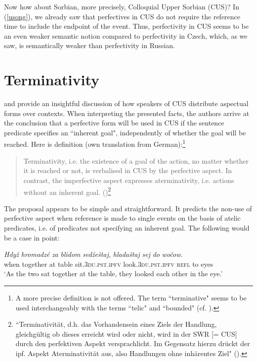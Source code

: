 \documentclass[output=paper,colorlinks,citecolor=brown]{langscibook}
\begin{document}
Now how about Sorbian, more precisely, Colloquial Upper Sorbian (CUS)? In (\ref{usong}), we already saw that perfectives in CUS do not require the reference time to include the endpoint of the event. Thus, perfectivity in CUS seems to be an even weaker semantic notion compared to perfectivity in Czech, which, as we saw, is semantically weaker than perfectivity in Russian. 

\section{Terminativity}\label{mueller:sec:term}
\citet{Breu2000, Breu2012} and \citet{Scholze2008} provide an insightful discussion of how speakers of CUS distribute aspectual forms over contexts. When interpreting the presented facts, the authors arrive at the conclusion that a perfective form will be used in CUS if the sentence predicate specifies an ``inherent goal", independently of whether the goal will be reached. 
Here is  definition (own translation from German):\footnote{A more precise definition is not offered. The term ``terminative" seems to be used interchangeably with the terms ``telic" and ``bounded" (cf. \citealt[264]{Breu2012}).} 

\begin{quote}
Terminativity, i.e. the existence of a goal of the action, no matter
whether it is reached or not, is verbalised in CUS by the perfective aspect.
In contrast, the imperfective aspect expresses aterminativity,
i.e. actions without an 
inherent goal. 
(\citealt[232-233]{Scholze2008})\footnote{``Terminativit\"at, d.h. das Vorhandensein eines Ziels der Handlung, 
gleichg\"ultig ob dieses er\-reicht wird oder nicht, wird in der SWR [= CUS]
durch den perfektiven Aspekt versprachlicht. Im Gegensatz hierzu dr\"uckt 
der ipf. Aspekt Aterminativit\"at aus, 
also Handlungen ohne inh\"arentes Ziel" 
(\citealt[232-233]{Scholze2008}).} 
\end{quote}

The proposal appears to be simple and straightforward.
It predicts the non-use of perfective aspect when reference is made to single events on the basis of atelic predicates, i.e. of predicates not specifying an inherent goal. The following would be a case in point: 

 \ea\label{blid}
\gll \textit{Hdyž} \textit{hromadz\'e} \textit{za} \textit{blidom} \textit{sed\'zeštaj,}
\textit{hladaštaj} \textit{sej} \textit{do} \textit{wo\v{c}ow.}\\
when together at table sit.\textsc{3du.pst.ipfv} look.\textsc{3du.pst.ipfv} \textsc{refl} to eyes\\
\glt \normalsize{`As the two sat together at the table, they looked each other in the eye.'}
\z
\end{document}
